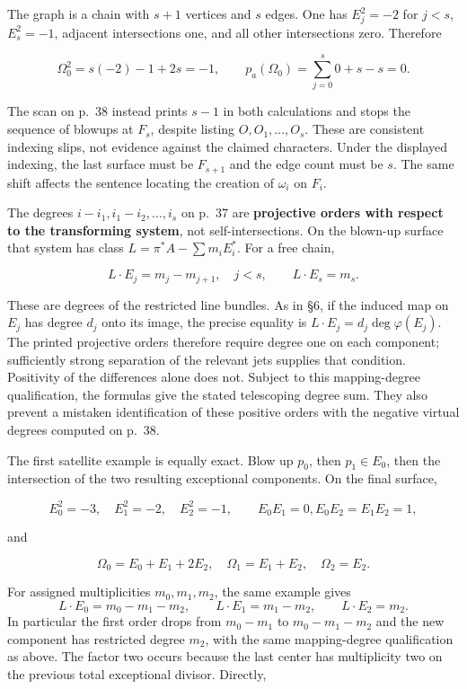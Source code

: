 The graph is a chain with \(s+1\) vertices and \(s\) edges. One has \(E_j^2=-2\) for \(j<s\), \(E_s^2=-1\), adjacent intersections one, and all other intersections zero. Therefore

\[
\Omega_0^2=s(-2)-1+2s=-1,\qquad
p_a(\Omega_0)=\sum_{j=0}^s0+s-s=0.
\]

The scan on p.~38 instead prints \(s-1\) in both calculations and stops the sequence of blowups at \(F_s\), despite listing \(O,O_1,\ldots,O_s\). These are consistent indexing slips, not evidence against the claimed characters. Under the displayed indexing, the last surface must be \(F_{s+1}\) and the edge count must be \(s\). The same shift affects the sentence locating the creation of \(\omega_i\) on \(F_i\).

The degrees \(i-i_1,i_1-i_2,\ldots,i_s\) on p.~37 are \textbf{projective orders with respect to the transforming system}, not self-intersections. On the blown-up surface that system has class \(L=\pi^*A-\sum m_iE_i^*\). For a free chain,

\[
L\cdot E_j=m_j-m_{j+1},\quad j<s,\qquad
L\cdot E_s=m_s.
\]

These are degrees of the restricted line bundles. As in §6, if the induced map on \(E_j\) has degree \(d_j\) onto its image, the precise equality is \(L\cdot E_j=d_j\deg\varphi(E_j)\). The printed projective orders therefore require degree one on each component; sufficiently strong separation of the relevant jets supplies that condition. Positivity of the differences alone does not. Subject to this mapping-degree qualification, the formulas give the stated telescoping degree sum. They also prevent a mistaken identification of these positive orders with the negative virtual degrees computed on p.~38.

The first satellite example is equally exact. Blow up \(p_0\), then \(p_1\in E_0\), then the intersection of the two resulting exceptional components. On the final surface,

\[
E_0^2=-3,\quad E_1^2=-2,\quad E_2^2=-1,\qquad
E_0E_1=0, E_0E_2=E_1E_2=1,
\]

and

\[
\Omega_0=E_0+E_1+2E_2,\quad
\Omega_1=E_1+E_2,\quad\Omega_2=E_2.
\]

For assigned multiplicities \(m_0,m_1,m_2\), the same example gives \[
L\cdot E_0=m_0-m_1-m_2,\qquad
L\cdot E_1=m_1-m_2,\qquad L\cdot E_2=m_2.
\] In particular the first order drops from \(m_0-m_1\) to \(m_0-m_1-m_2\) and the new component has restricted degree \(m_2\), with the same mapping-degree qualification as above. The factor two occurs because the last center has multiplicity two on the previous total exceptional divisor. Directly,

